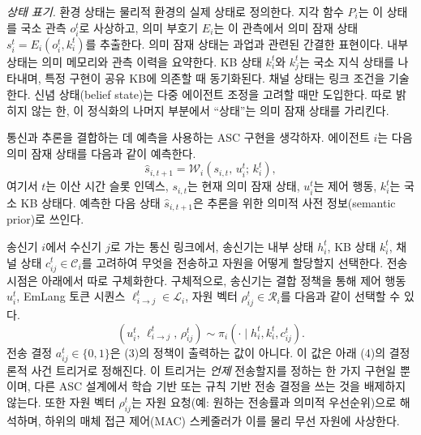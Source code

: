 \textit{상태 표기.}
환경 상태는 물리적 환경의 실제 상태로 정의한다.
지각 함수 $P_i$는 이 상태를 국소 관측 $o_i^t$로 사상하고, 의미 부호기 $E_i$는 이 관측에서 의미 잠재 상태 $s_i^t = E_i(o_i^t, k_i^t)$를 추출한다.
의미 잠재 상태는 과업과 관련된 간결한 표현이다.
내부 상태는 의미 메모리와 관측 이력을 요약한다.
KB 상태 $k_i^t$와 $k_j^t$는 국소 지식 상태를 나타내며, 특정 구현이 공유 KB에 의존할 때 동기화된다.
채널 상태는 링크 조건을 기술한다.
신념 상태(belief state)는 다중 에이전트 조정을 고려할 때만 도입한다.
따로 밝히지 않는 한, 이 정식화의 나머지 부분에서 ``상태''는 의미 잠재 상태를 가리킨다.

통신과 추론을 결합하는 데 예측을 사용하는 ASC 구현을 생각하자.
에이전트 $i$는 다음 의미 잠재 상태를 다음과 같이 예측한다.
\begin{equation}
\hat{s}_{i,t+1} = \mathcal{W}_i(s_{i,t},\, u_i^t;\, k_i^t), \tag{2}
\end{equation}
여기서 $t$는 이산 시간 슬롯 인덱스, $s_{i,t}$는 현재 의미 잠재 상태, $u_i^t$는 제어 행동, $k_i^t$는 국소 KB 상태다.
예측한 다음 상태 $\hat{s}_{i,t+1}$은 추론을 위한 의미적 사전 정보(semantic prior)로 쓰인다.

송신기 $i$에서 수신기 $j$로 가는 통신 링크에서, 송신기는 내부 상태 $h_i^t$, KB 상태 $k_i^t$, 채널 상태 $c_{ij}^t \in \mathcal{C}_i$를 고려하여 무엇을 전송하고 자원을 어떻게 할당할지 선택한다.
전송 시점은 아래에서 따로 구체화한다.
구체적으로, 송신기는 결합 정책을 통해 제어 행동 $u_i^t$, EmLang 토큰 시퀀스 $\ell_{i\to j}^t \in \mathcal{L}_i$, 자원 벡터 $\rho_{ij}^t \in \mathcal{R}_i$를 다음과 같이 선택할 수 있다.
\begin{equation}
(u_i^t,\, \ell_{i\to j}^t,\, \rho_{ij}^t) \sim \pi_i(\cdot \mid h_i^t, k_i^t, c_{ij}^t). \tag{3}
\end{equation}
전송 결정 $a_{ij}^t \in \{0,1\}$은 (3)의 정책이 출력하는 값이 아니다.
이 값은 아래 (4)의 결정론적 사건 트리거로 정해진다.
이 트리거는 \textit{언제} 전송할지를 정하는 한 가지 구현일 뿐이며, 다른 ASC 설계에서 학습 기반 또는 규칙 기반 전송 결정을 쓰는 것을 배제하지 않는다.
또한 자원 벡터 $\rho_{ij}^t$는 자원 요청(예: 원하는 전송률과 의미적 우선순위)으로 해석하며, 하위의 매체 접근 제어(MAC) 스케줄러가 이를 물리 무선 자원에 사상한다.

